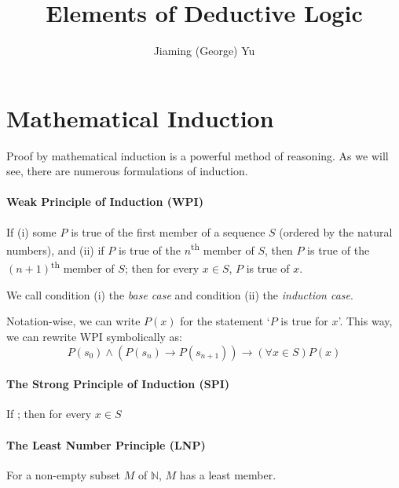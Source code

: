 \documentclass{article}
\title{Elements of Deductive Logic}
\author{Jiaming (George) Yu}
\newcommand*{\term}[1]{\textit{#1}}
\newcommand{\NN}{\mathbb{N}}
\renewcommand{\implies}{\rightarrow}
\begin{document}
\maketitle


\section{Mathematical Induction}

Proof by mathematical induction is a powerful method of reasoning. As we will see, there are numerous formulations of induction.

\paragraph{Weak Principle of Induction (WPI)} If (i) some $P$ is true of the first member of a sequence $S$ (ordered by the natural numbers), and (ii) if $P$ is true of the $n$\textsuperscript{th} member of $S$, then $P$ is true of the $(n + 1)$\textsuperscript{th} member of $S$; then for every $x \in S$, $P$ is true of $x$.

We call condition (i) the \term{base case} and condition (ii) the \term{induction case}.

Notation-wise, we can write $P(x)$ for the statement `$P$ is true for $x$'. This way, we can rewrite WPI symbolically as:
\[ P(s_0) \wedge (P(s_n) \implies P(s_{n+1})) \implies (\forall x \in S) P(x) \]

\paragraph{The Strong Principle of Induction (SPI)} If ; then for every $x \in S$

\paragraph{The Least Number Principle (LNP)} For a non-empty subset $M$ of $\NN$, $M$ has a least member.
\end{document}
